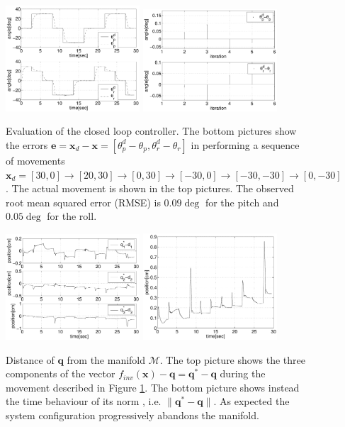 \documentclass[conference]{IEEEtran}
\numberwithin{equation}{section}
\newcommand{\q}{\mathbf{q}}
\newcommand{\x}{\mathbf{x}}
\begin{document}
\begin{figure}[tbp]
\centering 
\includegraphics[width=50mm]{image/AngleJacobian.pdf} 
\includegraphics[width=50mm]{image/ErrorsJacobian.pdf} 
\caption{Evaluation of the closed loop controller. The bottom pictures show the errors $\mathbf e = \x_d - \x  = [\theta_p^d - \theta_p, \theta_r^d - \theta_r]$ in performing a sequence of movements $\x_d = [30, 0] \rightarrow[20, 30] \rightarrow[0, 30] \rightarrow[-30, 0] \rightarrow[-30, -30] \rightarrow[0, -30]$. The actual movement is shown in the top pictures. The observed root mean squared error (RMSE) is $0.09 \deg$ for the pitch and $0.05 \deg$ for the roll.}
\label{Fig:ErrorJacobian}
\end{figure}

\begin{figure}[tbp]
\centering 
\includegraphics[width=50mm]{image/ManifoldDistanceQJacobian.pdf} 
\includegraphics[width=50mm]{image/ManifoldDistanceJacobian.pdf} 
\caption{Distance of $\q$ from the manifold $\mathcal M$. The top picture shows the three components of the vector $f_{inv}(\x) -\q  = \q^* -\q$ during the movement described in Figure \ref{Fig:ErrorJacobian}. The bottom picture shows instead the time behaviour of its norm , i.e. $\| \q^* - \q \|$. As expected the system configuration progressively abandons the manifold.}
\label{Fig:ManifoldDistanceJacobian}
\end{figure}
\end{document}
